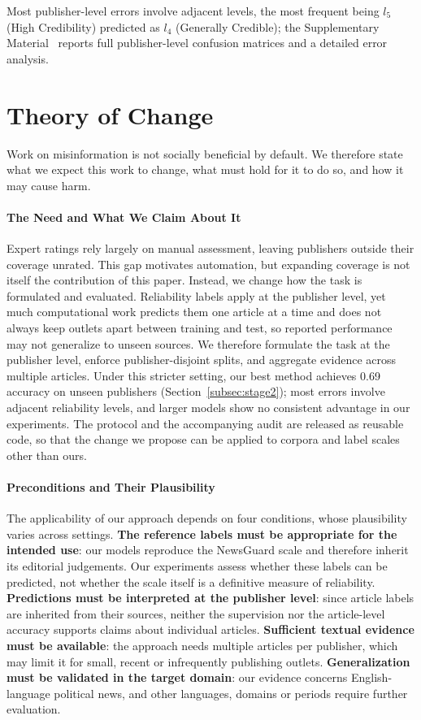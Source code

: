 \documentclass[runningheads]{llncs}
\begin{document}
Most publisher-level errors involve adjacent levels, the most frequent being $l_5$ (High Credibility) predicted as $l_4$ (Generally Credible); the Supplementary Material~\cite{suppmaterial2026} reports full publisher-level confusion matrices and a detailed error analysis.




\section{Theory of Change}
\label{sec:theoryofchange}

Work on misinformation is not socially beneficial by default. We therefore state what we expect this work to change, what must hold for it to do so, and how it may cause harm.

\paragraph{The Need and What We Claim About It} Expert ratings rely largely on manual assessment, leaving publishers outside their coverage unrated. This gap motivates automation, but expanding coverage is not itself the contribution of this paper. Instead, we change how the task is formulated and evaluated. Reliability labels apply at the publisher level, yet much computational work predicts them one article at a time and does not always keep outlets apart between training and test, so reported performance may not generalize to unseen sources. We therefore formulate the task at the publisher level, enforce publisher-disjoint splits, and aggregate evidence across multiple articles. Under this stricter setting, our best method achieves 0.69 accuracy on unseen publishers (Section~\ref{subsec:stage2}); most errors involve adjacent reliability levels, and larger models show no consistent advantage in our experiments. The protocol and the accompanying audit are released as reusable code, so that the change we propose can be applied to corpora and label scales other than ours.


\paragraph{Preconditions and Their Plausibility} The applicability of our approach depends on four conditions, whose plausibility varies across settings. \textbf{The reference labels must be appropriate for the intended use}: our models reproduce the NewsGuard scale and therefore inherit its editorial judgements. Our experiments assess whether these labels can be predicted, not whether the scale itself is a definitive measure of reliability. \textbf{Predictions must be interpreted at the publisher level}: since article labels are inherited from their sources, neither the supervision nor the article-level accuracy supports claims about individual articles. \textbf{Sufficient textual evidence must be available}: the approach needs multiple articles per publisher, which may limit it for small, recent or infrequently publishing outlets. \textbf{Generalization must be validated in the target domain}: our evidence concerns English-language political news, and other languages, domains or periods require further evaluation.
\end{document}
